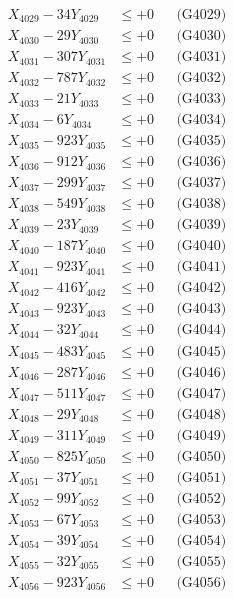 \documentclass[a4paper,10pt]{article}
\begin{document}
{\begin{align}
X_{4029} - 34Y_{4029} &\leq +0 && \text{(G4029)} \\
X_{4030} - 29Y_{4030} &\leq +0 && \text{(G4030)} \\
\allowbreak
X_{4031} - 307Y_{4031} &\leq +0 && \text{(G4031)} \\
X_{4032} - 787Y_{4032} &\leq +0 && \text{(G4032)} \\
X_{4033} - 21Y_{4033} &\leq +0 && \text{(G4033)} \\
X_{4034} - 6Y_{4034} &\leq +0 && \text{(G4034)} \\
X_{4035} - 923Y_{4035} &\leq +0 && \text{(G4035)} \\
X_{4036} - 912Y_{4036} &\leq +0 && \text{(G4036)} \\
X_{4037} - 299Y_{4037} &\leq +0 && \text{(G4037)} \\
X_{4038} - 549Y_{4038} &\leq +0 && \text{(G4038)} \\
X_{4039} - 23Y_{4039} &\leq +0 && \text{(G4039)} \\
X_{4040} - 187Y_{4040} &\leq +0 && \text{(G4040)} \\
\allowbreak
X_{4041} - 923Y_{4041} &\leq +0 && \text{(G4041)} \\
X_{4042} - 416Y_{4042} &\leq +0 && \text{(G4042)} \\
X_{4043} - 923Y_{4043} &\leq +0 && \text{(G4043)} \\
X_{4044} - 32Y_{4044} &\leq +0 && \text{(G4044)} \\
X_{4045} - 483Y_{4045} &\leq +0 && \text{(G4045)} \\
X_{4046} - 287Y_{4046} &\leq +0 && \text{(G4046)} \\
X_{4047} - 511Y_{4047} &\leq +0 && \text{(G4047)} \\
X_{4048} - 29Y_{4048} &\leq +0 && \text{(G4048)} \\
X_{4049} - 311Y_{4049} &\leq +0 && \text{(G4049)} \\
X_{4050} - 825Y_{4050} &\leq +0 && \text{(G4050)} \\
\allowbreak
X_{4051} - 37Y_{4051} &\leq +0 && \text{(G4051)} \\
X_{4052} - 99Y_{4052} &\leq +0 && \text{(G4052)} \\
X_{4053} - 67Y_{4053} &\leq +0 && \text{(G4053)} \\
X_{4054} - 39Y_{4054} &\leq +0 && \text{(G4054)} \\
X_{4055} - 32Y_{4055} &\leq +0 && \text{(G4055)} \\
X_{4056} - 923Y_{4056} &\leq +0 && \text{(G4056)} \\

\end{align}}
\end{document}
